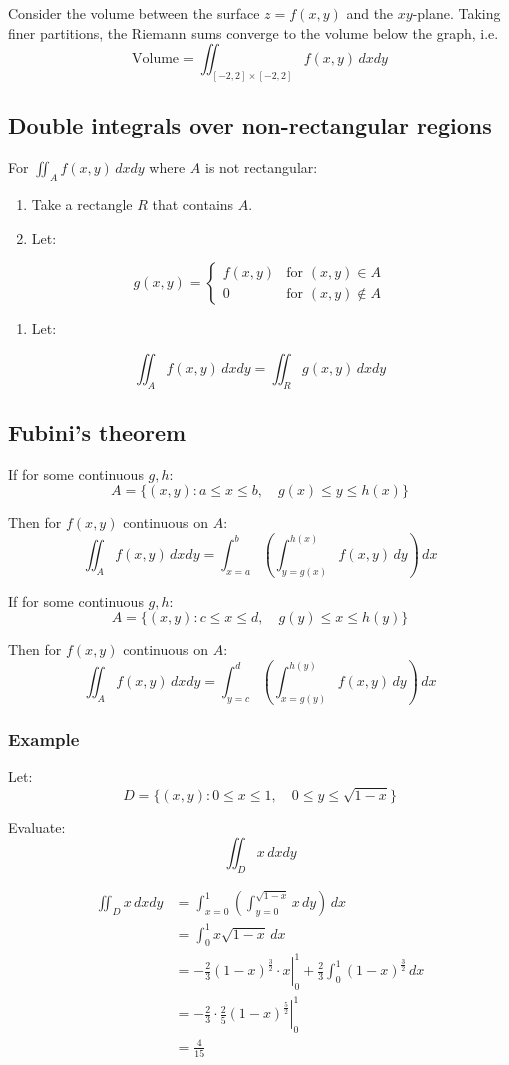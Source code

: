 \documentclass[11pt]{article}
\begin{document}
Consider the volume between the surface \(z = f(x, y)\) and the \(xy\)-plane. Taking finer partitions, the Riemann sums converge to the volume below the graph, i.e.
\[\text{Volume} = \iint_{[-2, 2] \times [-2, 2]} f(x, y) \, dx dy\]

\subsection{Double integrals over non-rectangular regions}
\label{sec:orgb336077}
For \(\iint_A f(x, y) \, dx dy\) where \(A\) is not rectangular:
\begin{enumerate}
\item Take a rectangle \(R\) that contains \(A\).
\item Let:
\end{enumerate}
\[
g(x, y) = \begin{cases}
f(x, y) & \text{for } (x, y) \in A \\
0 & \text{for } (x, y) \notin A
\end{cases}
\]
\begin{enumerate}
\item Let:
\end{enumerate}
\[\iint_A f(x, y) \, dx dy = \iint_R g(x, y) \, dx dy\]

\subsection{Fubini's theorem}
\label{sec:orge623a37}
If for some continuous \(g, h\):
\[A = \{(x, y) : a \le x \le b, \quad g(x) \le y \le h(x)\}\]

Then for \(f(x, y)\) continuous on \(A\):
\[\iint_A f(x, y) \, dx dy = \int_{x = a}^b \left( \int_{y = g(x)}^{h(x)} f(x, y) \, dy \right) \, dx\]

If for some continuous \(g, h\):
\[A = \{(x, y) : c \le x \le d, \quad g(y) \le x \le h(y)\}\]

Then for \(f(x, y)\) continuous on \(A\):
\[\iint_A f(x, y) \, dx dy = \int_{y = c}^d \left( \int_{x = g(y)}^{h(y)} f(x, y) \, dy \right) \, dx\]

\subsubsection{Example}
\label{sec:org5a07d6e}
Let:
\[D = \{(x, y) : 0 \le x \le 1, \quad 0 \le y \le \sqrt{1 - x}\}\]

Evaluate:
\[\iint_D x \, dx dy\]

\begin{align*}
\iint_D x \, dx dy &= \int_{x = 0}^1 \left( \int_{y = 0}^{\sqrt{1 - x}} x \, dy \right) \, dx \\
&= \int_0^1 x \sqrt{1 - x} \, dx \\
&= - \left. \frac{2}{3} (1 - x)^{\frac{3}{2}} \cdot x \right|_0^1 + \frac{2}{3} \int_0^1 (1 - x)^{\frac{3}{2}} \, dx \\
&= - \left. \frac{2}{3} \cdot \frac{2}{5} (1 - x)^{\frac{5}{2}} \right|_0^1 \\
&= \frac{4}{15}
\end{align*}
\end{document}
